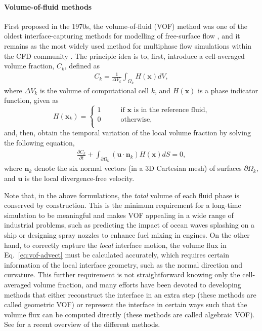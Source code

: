\paragraph{\bf Volume-of-fluid methods}
First proposed in the 1970s, the volume-of-fluid (VOF) method was one of the oldest interface-capturing methods for modelling of free-surface flow \citep{Debar1974, hirt_nichols_1975, hirt_nichols_1981a}, and it remains as the most widely used method for multiphase flow simulations within the CFD community \citep{Scardovelli_Zaleski_1999, gerris, pilliod_puckett_2004, xiao_honma_kono_2005a, mthinc2012, paris2019}.
The principle idea is to, first, introduce a cell-averaged volume fraction, $C_{k}$, defined as
\begin{equation}
 \begin{aligned}
   C_{k} = \frac{1}{\Delta V_k} \int_{\Omega_k} H(\bm{x}) dV,
 \end{aligned}
\end{equation}
where $\Delta V_k$ is the volume of computational cell $k$, and $H(\bm{x})$ is a phase indicator function, given as
\begin{equation}
    H(\bm{x}_k)=
    \begin{cases}
        1 \quad \quad & \textrm{if $\bm{x}$ is in the reference fluid,} \\
        0 \quad & \textrm{otherwise}, \\
    \end{cases}
\end{equation}
and, then, obtain the temporal variation of the local volume fraction by solving the following equation,
\begin{equation} \label{eq:vof-advect}
 \begin{aligned}
   \frac{\partial C_{k}}{\partial t} + \int_{\partial \Omega_k} (\bm{u \cdot n}_k) H(\bm{x}) dS =0,
 \end{aligned}
\end{equation}
where $\bm{n}_k$ denote the six normal vectors (in a 3D Cartesian mesh) of surfaces $\partial \Omega_k$, and $\bm u$ is the local divergence-free velocity.

Note that, in the above formulations, the \emph{total} volume of each fluid phase is conserved by construction.
This is the minimum requirement for a long-time simulation to be meaningful and makes VOF appealing in a wide range of industrial problems, such as predicting the impact of ocean waves splashing on a ship or designing spray nozzles to enhance fuel mixing in engines.
On the other hand, to correctly capture the \emph{local} interface motion, the volume flux in Eq.\ \eqref{eq:vof-advect} must be calculated accurately, which requires certain information of the local interface geometry, such as the normal direction and curvature.
This further requirement is not straightforward knowing only the cell-averaged volume fraction, and many efforts have been devoted to developing methods that either reconstruct the interface in an extra step (these methods are called geometric VOF) or represent the interface in certain ways such that the volume flux can be computed directly (these methods are called algebraic VOF). See \cite{mirjalili_jain_dodd_2017a} for a recent overview of the different methods.

